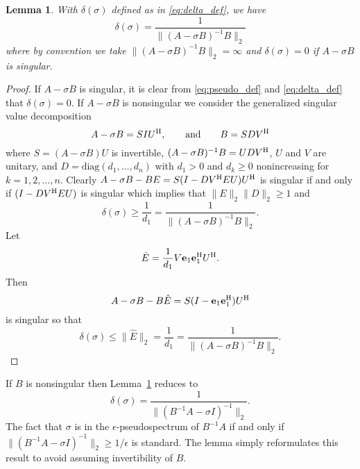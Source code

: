 \documentclass[12pt]{article}
\def\eqand{\qquad\mbox{and}\qquad}
\def\vec#1{{\bf #1}}
\def\H{{\rm H}}
\def\diag{\mbox{diag}}
\newtheorem{lemma}{Lemma}
\begin{document}
\begin{lemma}
  \label{lm:X_norm_bound}
  With $\delta(\sigma)$ defined as in \eqref{eq:delta_def}, we have
  \begin{equation*}
     \delta(\sigma) 
     = \frac{1}{\|(A-\sigma B)^{-1} B\|_2}
  \end{equation*}
  where by convention we take $\|(A-\sigma B)^{-1} B\|_2=\infty$ and $\delta(\sigma)=0$
  if $A-\sigma B$ is singular.
\end{lemma}
\begin{proof}
  If $A-\sigma B$ is singular, it is clear from \eqref{eq:pseudo_def}
  and \eqref{eq:delta_def} that $\delta(\sigma)=0$.  If $A-\sigma B$
  is nonsingular we consider the generalized singular value
  decomposition
  \begin{equation*}
    A - \sigma B = S I U^\H,\eqand
    B = S D V^\H
  \end{equation*}
  where $S=(A-\sigma B)U$ is invertible,
  $(A-\sigma B)^{-1} B = U D V^\H$, $U$ and $V$ are unitary, and
  $D = \diag(d_1, \ldots, d_n)$ with $d_1 > 0$ and $d_k\geq 0$
  nonincreasing for $k=1,2,\ldots, n$.   Clearly
  $A-\sigma B - BE = S (I - D V^\H E U) U^\H$ is
  singular if and only if $(I - D V^\H E U)$ is singular which implies
  that $\|E\|_2 \|D\|_2 \geq 1$ and
  \begin{equation*}
    \delta(\sigma)
    \geq \frac{1}{d_1} =
    \frac{1}{\|(A-\sigma B)^{-1}B\|_2}.
  \end{equation*}
  Let  
  \begin{equation*}
    \hat{E} = \frac{1}{d_1}V \vec{e}_1 \vec{e}_1^\H U^\H.
  \end{equation*}
  Then
  \begin{equation*}
    A-\sigma B - B \hat{E} = S (I-\vec{e}_1 \vec{e}_1^\H) U^\H
  \end{equation*}
  is singular so that
  \begin{equation*}
    \delta(\sigma)
    \leq \|\hat{E}\|_2 
    = \frac{1}{d_1} = \frac{1}{\|(A-\sigma B)^{-1} B\|_2}.
  \end{equation*}
\end{proof}

If $B$ is nonsingular then Lemma~\ref{lm:X_norm_bound} reduces to
\begin{equation*}
  \delta(\sigma) = \frac{1}{\|(B^{-1}A - \sigma I)^{-1}\|_2}.
\end{equation*}
The fact that $\sigma$ is in the $\epsilon$-pseudospectrum of
$B^{-1}A$ if and only if
$\|(B^{-1}A - \sigma I)^{-1}\|_2\geq 1/\epsilon$ is standard.  The
lemma simply reformulates this result to avoid assuming invertibility
of $B$.
\end{document}
